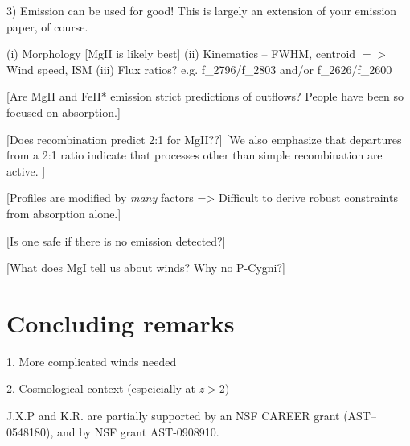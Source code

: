 \documentclass[12pt,preprint]{aastex}
\begin{document}
3)  Emission can be used for good!   This is largely an extension of
your emission paper, of course.

   (i)  Morphology [MgII is likely best]
  (ii)  Kinematics  --  FWHM, centroid $=>$  Wind speed, ISM
 (iii)  Flux ratios?  e.g.   f\_2796/f\_2803 and/or f\_2626/f\_2600

[Are MgII and FeII* emission strict predictions of outflows?  People
have been so focused on absorption.]

[Does recombination predict 2:1 for MgII??]
[We also emphasize that departures from a 2:1
ratio indicate that processes other than simple recombination are
active. ]

[Profiles are modified by {\it many} factors => Difficult to derive
robust constraints from absorption alone.]

[Is one safe if there is no emission detected?]

[What does MgI tell us about winds?  Why no P-Cygni?]

\section{Concluding remarks}
\label{sec:conclude}

1. More complicated winds needed

2. Cosmological context (espeicially at $z>2$)

\acknowledgments

J.X.P and K.R. are partially supported
by an NSF CAREER grant (AST--0548180), and 
by NSF grant AST-0908910.

\clearpage

%
%



\clearpage







\end{document}
